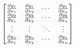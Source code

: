 


$$
\begin{bmatrix}
    \frac{\partial y_1}{\partial x_1} & \frac{\partial y_1}{\partial x_2}  & \cdots   &  \frac{\partial y_1}{\partial x_n}  \\
    \frac{\partial y_2}{\partial x_1} & \frac{\partial y_2}{\partial x_2} & \cdots   & \frac{\partial y_2}{\partial x_n}  \\
    \vdots & \vdots  & \ddots   & \vdots  \\
    \frac{\partial y_n}{\partial x_1} & \frac{\partial y_n}{\partial x_2}  & \cdots  & \frac{\partial y_n}{\partial x_n}  \\
\end{bmatrix} \\
$$  